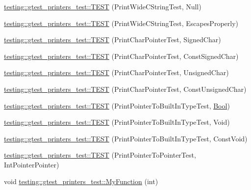 \begin{DoxyCompactItemize}
\item 
\hyperlink{namespacetesting_1_1gtest__printers__test_acd1267d49d61ad53b2b8a88f68fca3a7}{testing\+::gtest\+\_\+printers\+\_\+test\+::\+T\+E\+ST} (Print\+Wide\+C\+String\+Test, Null)
\item 
\hyperlink{namespacetesting_1_1gtest__printers__test_aa80d6bb47e6bf997dacf0c75322d12cf}{testing\+::gtest\+\_\+printers\+\_\+test\+::\+T\+E\+ST} (Print\+Wide\+C\+String\+Test, Escapes\+Properly)
\item 
\hyperlink{namespacetesting_1_1gtest__printers__test_acd7a56709621a91dca669023d192bdc7}{testing\+::gtest\+\_\+printers\+\_\+test\+::\+T\+E\+ST} (Print\+Char\+Pointer\+Test, Signed\+Char)
\item 
\hyperlink{namespacetesting_1_1gtest__printers__test_ae854b0ca4d06ffc273c391f262884681}{testing\+::gtest\+\_\+printers\+\_\+test\+::\+T\+E\+ST} (Print\+Char\+Pointer\+Test, Const\+Signed\+Char)
\item 
\hyperlink{namespacetesting_1_1gtest__printers__test_afb9a6a26323b287b7666b6adb5bdb149}{testing\+::gtest\+\_\+printers\+\_\+test\+::\+T\+E\+ST} (Print\+Char\+Pointer\+Test, Unsigned\+Char)
\item 
\hyperlink{namespacetesting_1_1gtest__printers__test_aa0487f8fd5052f7d6afe2b18ad7931f9}{testing\+::gtest\+\_\+printers\+\_\+test\+::\+T\+E\+ST} (Print\+Char\+Pointer\+Test, Const\+Unsigned\+Char)
\item 
\hyperlink{namespacetesting_1_1gtest__printers__test_ad08dcd672b1e66a802a564eb974c400a}{testing\+::gtest\+\_\+printers\+\_\+test\+::\+T\+E\+ST} (Print\+Pointer\+To\+Built\+In\+Type\+Test, \hyperlink{structBool}{Bool})
\item 
\hyperlink{namespacetesting_1_1gtest__printers__test_ac6d8b84db9386b399eb431b5b1668e87}{testing\+::gtest\+\_\+printers\+\_\+test\+::\+T\+E\+ST} (Print\+Pointer\+To\+Built\+In\+Type\+Test, Void)
\item 
\hyperlink{namespacetesting_1_1gtest__printers__test_a8819fb42392faae72e8bc594d498085d}{testing\+::gtest\+\_\+printers\+\_\+test\+::\+T\+E\+ST} (Print\+Pointer\+To\+Built\+In\+Type\+Test, Const\+Void)
\item 
\hyperlink{namespacetesting_1_1gtest__printers__test_afee54807b15b623718c62008bd743d4b}{testing\+::gtest\+\_\+printers\+\_\+test\+::\+T\+E\+ST} (Print\+Pointer\+To\+Pointer\+Test, Int\+Pointer\+Pointer)
\item 
void \hyperlink{namespacetesting_1_1gtest__printers__test_adf0e590d6776ecb7095a989ff2272d7b}{testing\+::gtest\+\_\+printers\+\_\+test\+::\+My\+Function} (int)

\end{DoxyCompactItemize}
